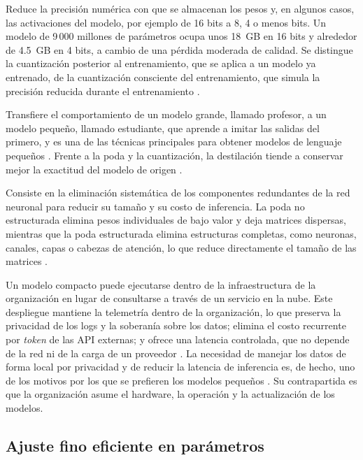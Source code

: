 Reduce la precisión numérica con que se almacenan los pesos y, en algunos casos, las activaciones del modelo, por ejemplo de 16 bits a 8, 4 o menos bits. Un modelo de 9\,000 millones de parámetros ocupa unos 18~GB en 16 bits y alrededor de 4.5~GB en 4 bits, a cambio de una pérdida moderada de calidad. Se distingue la cuantización posterior al entrenamiento, que se aplica a un modelo ya entrenado, de la cuantización consciente del entrenamiento, que simula la precisión reducida durante el entrenamiento \cite{wang2025_slm_survey}.

Transfiere el comportamiento de un modelo grande, llamado profesor, a un modelo pequeño, llamado estudiante, que aprende a imitar las salidas del primero, y es una de las técnicas principales para obtener modelos de lenguaje pequeños \cite{wang2025_slm_survey}. Frente a la poda y la cuantización, la destilación tiende a conservar mejor la exactitud del modelo de origen \cite{yang2025_lightweight}.

Consiste en la eliminación sistemática de los componentes redundantes de la red neuronal para reducir su tamaño y su costo de inferencia. La poda no estructurada elimina pesos individuales de bajo valor y deja matrices dispersas, mientras que la poda estructurada elimina estructuras completas, como neuronas, canales, capas o cabezas de atención, lo que reduce directamente el tamaño de las matrices \cite{wang2025_slm_survey}.

Un modelo compacto puede ejecutarse dentro de la infraestructura de la organización en lugar de consultarse a través de un servicio en la nube. Este despliegue mantiene la telemetría dentro de la organización, lo que preserva la privacidad de los logs y la soberanía sobre los datos; elimina el costo recurrente por \textit{token} de las API externas; y ofrece una latencia controlada, que no depende de la red ni de la carga de un proveedor \cite{pardeshi2026_smartllm}. La necesidad de manejar los datos de forma local por privacidad y de reducir la latencia de inferencia es, de hecho, uno de los motivos por los que se prefieren los modelos pequeños \cite{wang2025_slm_survey}. Su contrapartida es que la organización asume el hardware, la operación y la actualización de los modelos.

\subsection{Ajuste fino eficiente en parámetros}\label{sec:mt_peft}

